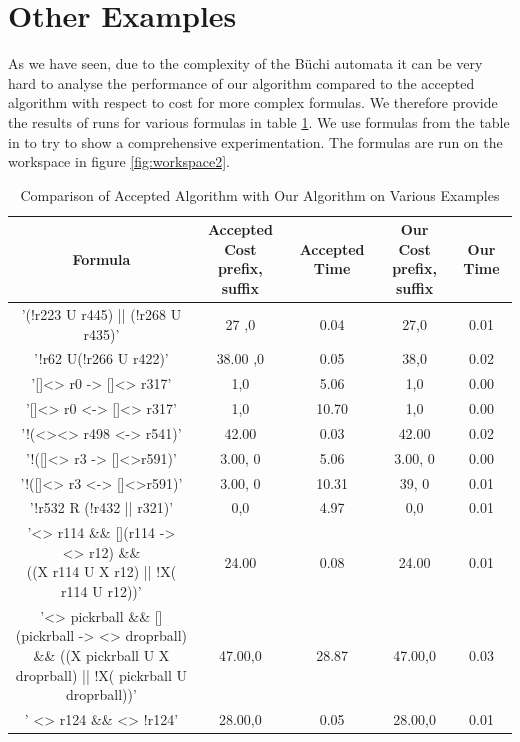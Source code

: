 \section{Other Examples}
As we have seen, due to the complexity of the B\"uchi automata it can be very hard to analyse the performance of our algorithm compared to the accepted algorithm with respect to cost for more complex formulas. We therefore provide the results of runs for various formulas in table \ref{table}. We use formulas from the table in \cite{somenzi00} to try to show a comprehensive experimentation. The formulas are run on the workspace in figure \ref{fig:workspace2}. 

\begin{landscape}
\begin{table}[]
\centering
\small
\begin{tabular}{|c|c|c|c|c|}
\hline
Formula & \makecell{Accepted Cost \\ prefix, suffix} & Accepted Time & \makecell{Our Cost \\ prefix, suffix} & Our Time \\ \hline
     '(!r223 U r445) || (!r268 U r435)'  &         27 ,0     &      0.04         &      27,0   &     0.01     \\ \hline
      '!r62 U(!r266 U r422)'  &         38.00 ,0     &       0.05        &     38,0     &     0.02     \\ \hline
       '[]<> r0 -> []<> r317' &         1,0      &       5.06        &    1,0      &    0.00     \\ \hline
       '[]<> r0 <-> []<> r317'  & 1,0		&		10.70		& 1,0 	&  0.00 \\ \hline 
      '!(<><> r498 <-> r541)' &	42.00	&	0.03	&	42.00	&	0.02	\\		\hline
      '!([]<> r3 -> []<>r591)' &	 3.00, 0	&	5.06 	&	3.00, 0 	&	0.00	\\		\hline
      '!([]<> r3 <-> []<>r591)' &	 3.00, 0	&	10.31	&	39, 0	&	0.01	\\		\hline
      '!r532 R (!r432 || r321)' &	 0,0	&	4.97 	&	0,0	&	0.01 	\\		\hline
     \makecell{ '<> r114 \&\& [](r114 -> <> r12) \&\& \\((X r114 U X r12) || !X( r114 U r12))' }&	24.00	&	0.08 	&	24.00	&	0.01	\\		\hline
   \makecell{ '<> pickrball \&\& [](pickrball -> <> droprball) \\ \&\& ((X pickrball U X droprball) || !X( pickrball U droprball))' } &	47.00,0	&	28.87	&	47.00,0	&	0.03	\\		\hline
      ' <> r124 \&\& <> !r124' &	28.00,0	&	0.05 	&	28.00,0	&	0.01	\\		\hline
\end{tabular}
\caption{Comparison of Accepted Algorithm with Our Algorithm on Various Examples}
\label{table}
\end{table}
\end{landscape}

